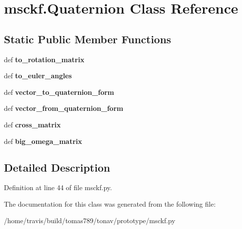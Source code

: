 \hypertarget{classmsckf_1_1_quaternion}{\section{msckf.\-Quaternion Class Reference}
\label{classmsckf_1_1_quaternion}
}
\subsection*{Static Public Member Functions}
\begin{DoxyCompactItemize}
\item 
\hypertarget{classmsckf_1_1_quaternion_a0bd71eee1eb3c21c88e95dd7dad39b2b}{def {\bfseries to\-\_\-rotation\-\_\-matrix}}\label{classmsckf_1_1_quaternion_a0bd71eee1eb3c21c88e95dd7dad39b2b}

\item 
\hypertarget{classmsckf_1_1_quaternion_a1ad344e0e8b25fcedcea28e57dd1194b}{def {\bfseries to\-\_\-euler\-\_\-angles}}\label{classmsckf_1_1_quaternion_a1ad344e0e8b25fcedcea28e57dd1194b}

\item 
\hypertarget{classmsckf_1_1_quaternion_af96060fbd037864de9e4386cf32557f9}{def {\bfseries vector\-\_\-to\-\_\-quaternion\-\_\-form}}\label{classmsckf_1_1_quaternion_af96060fbd037864de9e4386cf32557f9}

\item 
\hypertarget{classmsckf_1_1_quaternion_a0c8379745cc348059060aed3a8abf67c}{def {\bfseries vector\-\_\-from\-\_\-quaternion\-\_\-form}}\label{classmsckf_1_1_quaternion_a0c8379745cc348059060aed3a8abf67c}

\item 
\hypertarget{classmsckf_1_1_quaternion_aaaa45c31c39141a8fb00c13dfda9635d}{def {\bfseries cross\-\_\-matrix}}\label{classmsckf_1_1_quaternion_aaaa45c31c39141a8fb00c13dfda9635d}

\item 
\hypertarget{classmsckf_1_1_quaternion_a492071a17aa06a82ab0a30abdc6211bf}{def {\bfseries big\-\_\-omega\-\_\-matrix}}\label{classmsckf_1_1_quaternion_a492071a17aa06a82ab0a30abdc6211bf}

\end{DoxyCompactItemize}


\subsection{Detailed Description}


Definition at line 44 of file msckf.\-py.



The documentation for this class was generated from the following file\-:\begin{DoxyCompactItemize}
\item 
/home/travis/build/tomas789/tonav/prototype/msckf.\-py\end{DoxyCompactItemize}
